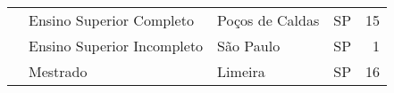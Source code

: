 \begin{table}[h]
\begin{tabular}{|l|l|l|l|r|}
                           & Ensino Superior Completo                  & Poços de Caldas     & SP & 15                      \\ \cline{2-5} 
                           & Ensino Superior Incompleto                & São Paulo           & SP & 1                       \\ \cline{2-5} 
                           & Mestrado                                  & Limeira             & SP & 16                      \\ \hline
\end{tabular}
\end{table}



